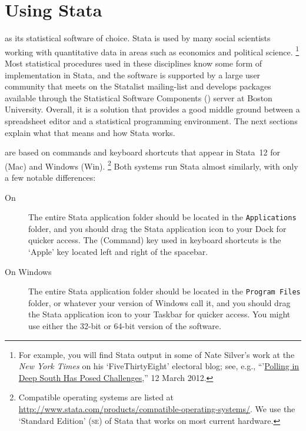 %
%
\section{Using Stata}%
	\label{sec:stata}%
	
	 as its statistical software of choice. Stata is used by many social scientists working with quantitative data in areas such as economics and political science.%
 	\footnote{For example, you will find Stata output in some of Nate Silver's work at the \emph{New York Times} on his `FiveThirtyEight' electoral blog; see, e.g., ``'\href{http://fivethirtyeight.blogs.nytimes.com/2012/03/12/polling-in-deep-south-has-posed-challenges/}{Polling in Deep South Has Posed Challenges},'' 12 March 2012.} %
	Most statistical procedures used in these disciplines know some form of implementation in Stata, and the software is supported by a large user community that meets on the Statalist mailing-list and develops packages available through the Statistical Software Components (\SSC) server at Boston University. Overall, it is a solution that provides a good middle ground between a spreadsheet editor and a statistical programming environment. The next sections explain what that means and how Stata works.%

 are based on commands and keyboard shortcuts that appear in Stata~12 for \OSX (Mac) and Windows (Win).%
		\footnote{Compatible operating systems are listed at %
		\url{http://www.stata.com/products/compatible-operating-systems/}. %
		We use the `Standard Edition' (\textsc{se}) of Stata that works on most current hardware.} %
		Both systems run Stata almost similarly, with only a few notable differences:%
		
	\begin{description}

		\item[On \OSX] %
		The entire Stata application folder should be located in the \texttt{Applications} folder, and you should drag the Stata application icon to your Dock for quicker access. The  (Command) key used in keyboard shortcuts is the `Apple' key located left and right of the spacebar.%

		\item[On Windows] %
		The entire Stata application folder should be located in the \texttt{Program Files} folder, or whatever your version of Windows call it, and you should drag the Stata application icon to your Taskbar for quicker access. You might use either the 32-bit or 64-bit version of the software.%

	\end{description}

